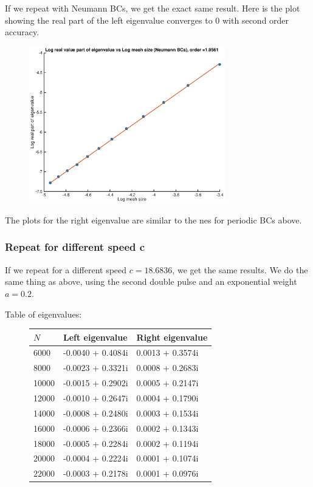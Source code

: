 \documentclass[12pt]{article}
\begin{document}
If we repeat with Neumann BCs, we get the exact same result. Here is the plot showing the real part of the left eigenvalue converges to 0 with second order accuracy.

\begin{figure}[H]
\includegraphics[width=8.5cm]{double2Neumannlogplot}
\end{figure}
The plots for the right eigenvalue are similar to the nes for periodic BCs above.

\subsubsection*{Repeat for different speed c}
If we repeat for a different speed $c = 18.6836$, we get the same results. We do the same thing as above, using the second double pulse and an exponential weight $a = 0.2$.

Table of eigenvalues:
\begin{figure}[H]
\begin{tabular}{l|ll}
$N$     & Left eigenvalue     &  Right eigenvalue  \\ \hline
        6000 &   -0.0040 + 0.4084i   & 0.0013 + 0.3574i \\ 
        8000 &   -0.0023 + 0.3321i   & 0.0008 + 0.2683i \\ 
       10000 &   -0.0015 + 0.2902i   & 0.0005 + 0.2147i \\ 
       12000 &   -0.0010 + 0.2647i   & 0.0004 + 0.1790i \\ 
       14000 &   -0.0008 + 0.2480i   & 0.0003 + 0.1534i \\ 
       16000 &   -0.0006 + 0.2366i   & 0.0002 + 0.1343i \\ 
       18000 &   -0.0005 + 0.2284i   & 0.0002 + 0.1194i \\ 
       20000 &   -0.0004 + 0.2224i   & 0.0001 + 0.1074i \\ 
       22000 &   -0.0003 + 0.2178i   & 0.0001 + 0.0976i \\    
\end{tabular}
\end{figure}
\end{document}
